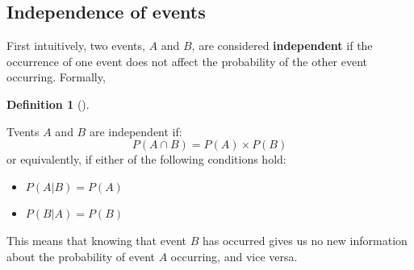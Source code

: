 \documentclass[
  letterpaper,
  DIV=11,
  numbers=noendperiod]{scrreport}
\theoremstyle{definition}
\theoremstyle{plain}
\theoremstyle{definition}
\newtheorem{definition}{Definition}[chapter]
\theoremstyle{plain}
\theoremstyle{remark}
\begin{document}
\subsection{Independence of events}\label{independence-of-events}

First intuitively, two events, \(A\) and \(B\), are considered
\textbf{independent} if the occurrence of one event does not affect the
probability of the other event occurring. Formally,

\begin{tcolorbox}[enhanced jigsaw, breakable, opacityback=0, leftrule=.75mm, colback=white, bottomtitle=1mm, coltitle=black, toptitle=1mm, titlerule=0mm, bottomrule=.15mm, colframe=quarto-callout-note-color-frame, title={Independent Events}, opacitybacktitle=0.6, colbacktitle=quarto-callout-note-color!10!white, rightrule=.15mm, arc=.35mm, toprule=.15mm, left=2mm]

\begin{definition}[]\protect\hypertarget{def-independent-events}{}\label{def-independent-events}

Tvents \(A\) and \(B\) are independent if:
\[ P(A \cap B) = P(A) \times P(B) \] or equivalently, if either of the
following conditions hold:

\begin{itemize}
\item
  \(P(A|B) = P(A)\)
\item
  \(P(B|A) = P(B)\)
\end{itemize}

\end{definition}

\end{tcolorbox}

This means that knowing that event \(B\) has occurred gives us no new
information about the probability of event \(A\) occurring, and vice
versa.
\end{document}
